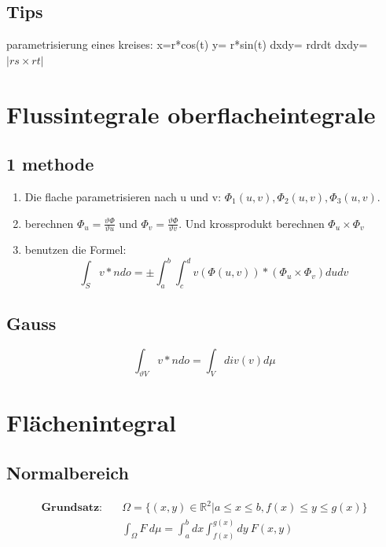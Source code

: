 \documentclass[11pt]{article}
\begin{document}
\subsection{Tips}
parametrisierung eines kreises: x=r*cos(t) y= r*sin(t) dxdy= rdrdt
dxdy=$|rs\times rt|$

\section{Flussintegrale oberflacheintegrale}
\subsection{1 methode}
\begin{enumerate}
	\item Die flache parametrisieren nach u und v: $\Phi_1(u,v),\Phi_2(u,v),\Phi_3(u,v)$.
	\item berechnen $\Phi_u = \frac{\vartheta \Phi}{\vartheta u}$ und $\Phi_v = \frac{\vartheta \Phi}{\vartheta v}$. Und krossprodukt berechnen $\Phi_u \times \Phi_v$
	\item benutzen die Formel:\begin{equation*}
		\int_S v*ndo=\pm\int^b_a\int_c^d v(\Phi(u,v))*(\Phi_u\times \Phi_v) dudv
	\end{equation*}
\end{enumerate}
\subsection{Gauss}
\begin{equation*}
	\int_{\vartheta V}v*ndo= \int_V div(v)d\mu
\end{equation*}


\section{Fl{\"a}chenintegral}

\subsection{Normalbereich}

\begin{equation*}
\begin{split}
	\textbf{Grundsatz:}\quad & \Omega = \{(x,y) \in \mathbb{R}^2| a \leq x \leq b, f(x) \leq y \leq g(x)\} \\
	& \int_\Omega F\ d\mu = \int_a^b dx \int_{f(x)}^{g(x)} dy\ F(x,y)
\end{split}
\end{equation*}
\end{document}
